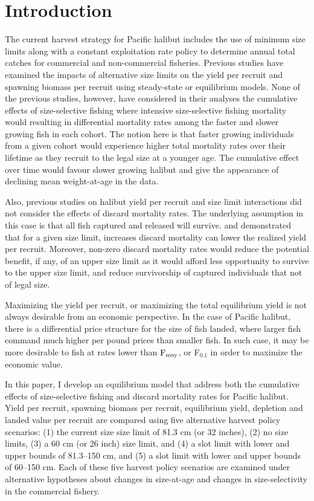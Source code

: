 \section*{Introduction} %
\label{sec:introduction}

The current harvest strategy for Pacific halibut includes the use of minimum size limits along with a constant exploitation rate policy to determine annual total catches for commercial and non-commercial fisheries.  Previous studies have examined the impacts of alternative size limits on the yield per recruit and spawning biomass per recruit using steady-state or equilibrium models.  None of the previous studies, however, have considered in their analyses the cumulative effects of size-selective fishing where intensive size-selective fishing mortality would resulting in differential mortality rates among the faster and slower growing fish in each cohort.  The notion here is that faster growing individuals from a given cohort would experience higher total mortality rates over their lifetime as they recruit to the legal size at a younger age. The cumulative effect over time would favour slower growing halibut and give the appearance of declining mean weight-at-age in the data.

Also, previous studies on halibut yield per recruit and size limit interactions did not consider the effects of discard mortality rates. The underlying assumption in this case is that all fish captured and released will survive. \cite{coggins2007ecm} and \cite{pineiii2008car} demonstrated that for a given size limit, increases discard mortality can lower the realized yield per recruit. Moreover, non-zero discard mortality rates would reduce the potential benefit, if any, of an upper size limit as it would afford less opportunity to survive to the upper size limit, and reduce survivorship of captured individuals that not of legal size.

Maximizing the yield per recruit, or maximizing the total equilibrium yield is not always desirable from an economic perspective.  In the case of Pacific halibut, there is a differential price structure for the size of fish landed, where larger fish command much higher per pound prices than smaller fish. In such case, it may be more desirable to fish at rates lower than $\rm{F_{msy}}$, or F$_{0.1}$ in order to maximize the economic value.

In this paper, I develop an equilibrium model that address both the cumulative effects of size-selective fishing and discard mortality rates for Pacific halibut.  Yield per recruit, spawning biomass per recruit, equilibrium yield, depletion and landed value per recruit are compared using five alternative harvest policy scenarios: (1) the current size size limit of 81.3 cm (or 32 inches), (2) no size limits, (3) a 60 cm (or 26 inch) size limit, and (4) a slot limit with lower and upper bounds of 81.3--150 cm, and (5) a slot limit with lower and upper bounds of 60--150 cm.  Each of these five harvest policy scenarios are examined under alternative hypotheses about changes in size-at-age and changes in size-selectivity in the commercial fishery.

